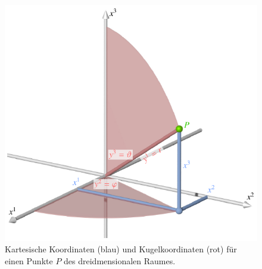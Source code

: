 %
%
%
\begin{figure}
\centering
\includegraphics{chapters/020-koordinaten/images/kartkugel.pdf}
\caption{Kartesische Koordinaten (blau) und Kugelkoordinaten (rot) für
einen Punkte $P$ des dreidmensionalen Raumes.
\label{buch:koordinaten:koordinaten:fig:kartkugel}}
\end{figure}
